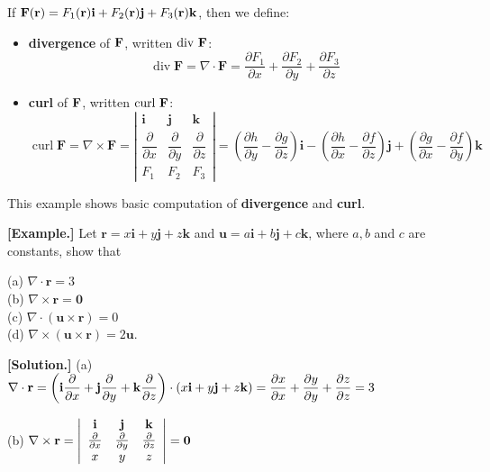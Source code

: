 \documentclass[11pt, a4paper]{MATH2023}
\newcommand{\eg}{\textbf{[Example.] }}
\newcommand{\sol}{\textbf{[Solution.] }}
\newcommand{\ii}{{\bf i}}
\newcommand{\jj}{{\bf j}}
\newcommand{\kk}{{\bf k}}
\newcommand{\rr}{{\bf r}}
\newcommand{\FF}{{\bf F}}
\renewcommand{\div}{{\rm div\ }}
\newcommand{\curl}{{\rm curl\ }}
\begin{document}
\begin{spacing}{1.3}
    If $\FF (\rr)=F_1(\rr)\ii +F_2(\rr) \jj +F_3(\rr) \kk$, then we define: 
    \begin{itemize}
        \item {\bf divergence} of $\FF$, written $\div \FF$: 
        $$
        \operatorname{div} \mathbf{F}=\nabla \cdot \mathbf{F}=\frac{\partial F_1}{\partial x}+\frac{\partial F_2}{\partial y}+\frac{\partial F_3}{\partial z}
        $$
        \item {\bf curl} of $\FF$, written $\curl \FF$: 
        $$
        \operatorname{curl} \mathbf{F}=\nabla \times \mathbf{F}=\left|\begin{array}{ccc}
        \mathbf{i} & \mathbf{j} & \mathbf{k} \\
        \dfrac{\partial}{\partial x} & \dfrac{\partial}{\partial y} & \dfrac{\partial}{\partial z} \\
        F_1 & F_2 & F_3
        \end{array}\right|=\left(\frac{\partial h}{\partial y}-\frac{\partial g}{\partial z}\right) \mathbf{i}-\left(\frac{\partial h}{\partial x}-\frac{\partial f}{\partial z}\right) \mathbf{j}+\left(\frac{\partial g}{\partial x}-\frac{\partial f}{\partial y}\right) \mathbf{k}
        $$
    \end{itemize}

    \vspace{0.2in}
    {\blue This example shows basic computation of {\bf divergence} and {\bf curl}.}

    \eg Let $\mathbf{r}=x \mathbf{i}+y \mathbf{j}+z \mathbf{k}$ and $\mathbf{u}=a \mathbf{i}+b \mathbf{j}+c \mathbf{k}$, where $a, b$ and $c$ are constants, show that

    (a) $\nabla \cdot \mathbf{r}=3$\\
    (b) $\nabla \times \mathbf{r}=\mathbf{0}$\\
    (c) $\nabla \cdot(\mathbf{u} \times \mathbf{r})=0$\\
    (d) $\nabla \times(\mathbf{u} \times \mathbf{r})=2 \mathbf{u}$.

    \sol 
    (a) $\displaystyle \nabla \cdot \mathbf{r}=\left(\mathbf{i} \frac{\partial}{\partial x}+\mathbf{j} \frac{\partial}{\partial y}+\mathbf{k} \frac{\partial}{\partial z}\right) \cdot(x \mathbf{i}+y \mathbf{j}+z \mathbf{k})=
    \frac{\partial x}{\partial x}+\frac{\partial y}{\partial y}+\frac{\partial z}{\partial z}=3$

    (b) $\displaystyle \nabla \times \mathbf{r}=\left|\begin{array}{ccc}
            \mathbf{i} & \mathbf{j} & \mathbf{k} \\ 
            \frac{\partial}{\partial x} & \frac{\partial}{\partial y} & \frac{\partial}{\partial z} \\ 
            x & y & z
        \end{array}\right|=\mathbf{0}$


\end{spacing}
\end{document}
